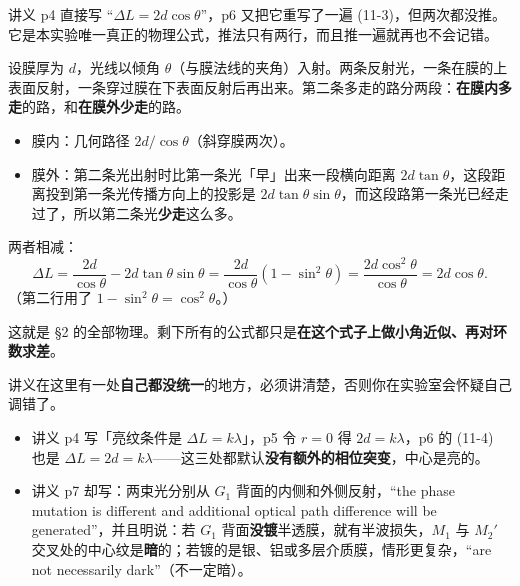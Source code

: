 \documentclass[11pt]{ctexart}
\begin{document}


讲义 p4 直接写 ``\(\Delta L=2d\cos\theta\)''，p6 又把它重写了一遍 (11-3)，但两次都没推。它是本实验唯一真正的物理公式，推法只有两行，而且推一遍就再也不会记错。

设膜厚为 \(d\)，光线以倾角 \(\theta\)（与膜法线的夹角）入射。两条反射光，一条在膜的上表面反射，一条穿过膜在下表面反射后再出来。第二条多走的路分两段：\textbf{在膜内多走}的路，和\textbf{在膜外少走}的路。

\begin{itemize}
\item 膜内：几何路径 \(2d/\cos\theta\)（斜穿膜两次）。
\item 膜外：第二条光出射时比第一条光「早」出来一段横向距离 \(2d\tan\theta\)，这段距离投到第一条光传播方向上的投影是 \(2d\tan\theta\sin\theta\)，而这段路第一条光已经走过了，所以第二条光\textbf{少走}这么多。
\end{itemize}

两者相减：
\[
\Delta L=\frac{2d}{\cos\theta}-2d\tan\theta\sin\theta
=\frac{2d}{\cos\theta}\left(1-\sin^2\theta\right)
=\frac{2d\cos^2\theta}{\cos\theta}
=2d\cos\theta .
\]
（第二行用了 \(1-\sin^2\theta=\cos^2\theta\)。）


这就是 §2 的全部物理。剩下所有的公式都只是\textbf{在这个式子上做小角近似、再对环数求差}。


讲义在这里有一处\textbf{自己都没统一}的地方，必须讲清楚，否则你在实验室会怀疑自己调错了。

\begin{itemize}
\item 讲义 p4 写「亮纹条件是 \(\Delta L=k\lambda\)」，p5 令 \(r=0\) 得 \(2d=k\lambda\)，p6 的 (11-4) 也是 \(\Delta L=2d=k\lambda\)——这三处都默认\textbf{没有额外的相位突变}，中心是亮的。
\item 讲义 p7 却写：两束光分别从 \(G_1\) 背面的内侧和外侧反射，``the phase mutation is different and additional optical path difference will be generated''，并且明说：若 \(G_1\) 背面\textbf{没镀}半透膜，就有半波损失，\(M_1\) 与 \(M_2'\) 交叉处的中心纹是\textbf{暗}的；若镀的是银、铝或多层介质膜，情形更复杂，``are not necessarily dark''（不一定暗）。
\end{itemize}
\end{document}
